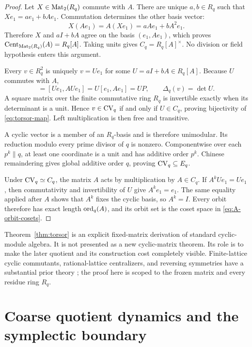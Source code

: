 \documentclass[11pt]{article}
\theoremstyle{definition}
\theoremstyle{remark}
\begin{document}
\begin{proof}
Let \(X\in\operatorname{Mat}_2(R_q)\) commute with \(A\).  There are unique
\(a,b\in R_q\) such that
\(Xe_1=ae_1+bAe_1\).  Commutation determines the other basis vector:
\[
  X(Ae_1)=A(Xe_1)=aAe_1+bA^2e_1.
\]
Therefore \(X\) and \(aI+bA\) agree on the basis
\((e_1,Ae_1)\), which proves
\(\operatorname{Cent}_{\operatorname{Mat}_2(R_q)}(A)=R_q[A]\).  Taking units gives
\(C_q=R_q[A]^\times\).  No division or field hypothesis enters this
argument.

Every \(v\in R_q^2\) is uniquely \(v=Ue_1\) for some
\(U=aI+bA\in R_q[A]\).  Because \(U\) commutes with \(A\),
\begin{equation}
  [v,Av]=[Ue_1,AUe_1]=U[e_1,Ae_1]=UP,
  \qquad
  \Delta_q(v)=\det U.
  \label{eq:delta-is-determinant}
\end{equation}
A square matrix over the finite commutative ring \(R_q\) is invertible
exactly when its determinant is a unit.  Hence \(v\in\mathrm{CV}_q\) if and only if
\(U\in C_q\), proving bijectivity of \eqref{eq:torsor-map}.  Left
multiplication is then free and transitive.

A cyclic vector is a member of an \(R_q\)-basis and is therefore
unimodular.  Its reduction modulo every prime divisor of \(q\) is nonzero.
Componentwise over each \(p^k\parallel q\), at least one coordinate is a
unit and has additive order \(p^k\).  Chinese remaindering gives global
additive order \(q\), proving \(\mathrm{CV}_q\subseteq E_q\).

Under \(\mathrm{CV}_q\simeq C_q\), the matrix \(A\) acts by multiplication by
\(A\in C_q\).  If \(A^kUe_1=Ue_1\), then commutativity and invertibility of
\(U\) give \(A^ke_1=e_1\).  The same equality applied after \(A\) shows
that \(A^k\) fixes the cyclic basis, so \(A^k=I\).  Every orbit therefore
has exact length \(\operatorname{ord}_q(A)\), and its orbit set is the coset space in
\eqref{eq:A-orbit-cosets}.
\end{proof}

Theorem~\ref{thm:torsor} is an explicit fixed-matrix derivation of standard
cyclic-module algebra.  It is not presented as a new cyclic-matrix theorem.
Its role is to make the later quotient and its construction cost completely
visible.  Finite-lattice cyclic commutants, rational-lattice centralizers,
and reversing symmetries have a substantial prior theory
\citep{BaakeNeumaerkerRoberts2013}; the proof here is scoped to the frozen
matrix and every residue ring \(R_q\).

\section{Coarse quotient dynamics and the symplectic boundary}
\label{sec:quotient}
\end{document}
